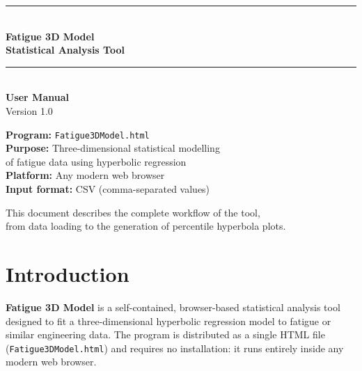 \documentclass[12pt,a4paper]{article}
\begin{document}

\begin{titlepage}
    \centering
    \vspace*{2cm}
    {\color{darkblue}\rule{\linewidth}{2pt}}\\[0.5cm]
    {\Huge\bfseries\color{darkblue} Fatigue 3D Model\\[0.4cm]
     \Large Statistical Analysis Tool}\\[0.3cm]
    {\color{primaryblue}\rule{\linewidth}{2pt}}\\[1.5cm]
    {\LARGE\bfseries User Manual}\\[0.5cm]
    {\large Version 1.0}\\[3cm]
    \begin{tcolorbox}[colback=lightgray, colframe=primaryblue, width=0.8\linewidth]
        \centering
        \textbf{Program:} \texttt{Fatigue3DModel.html}\\[4pt]
        \textbf{Purpose:} Three-dimensional statistical modelling\\
         of fatigue data using hyperbolic regression\\[4pt]
        \textbf{Platform:} Any modern web browser\\[4pt]
        \textbf{Input format:} CSV (comma-separated values)
    \end{tcolorbox}
    \vfill
    {\small\color{gray} This document describes the complete workflow of the tool,\\
    from data loading to the generation of percentile hyperbola plots.}
\end{titlepage}

\tableofcontents
\newpage

\section{Introduction}

\textbf{Fatigue 3D Model} is a self-contained, browser-based statistical analysis tool
designed to fit a three-dimensional hyperbolic regression model to fatigue or similar
engineering data.  The program is distributed as a single HTML file
(\texttt{Fatigue3DModel.html}) and requires no installation: it runs entirely inside
any modern web browser.
\end{document}
